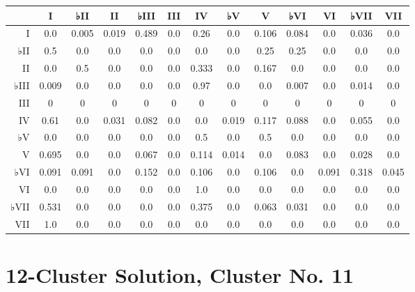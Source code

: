 \begin{table}[htbp]
\begin{minipage}{\linewidth}
\setlength{\tymax}{0.5\linewidth}
\centering
\small
\begin{tabulary}{\textwidth}{@{}RCCCCCCCCCCCC@{}} \toprule
&I&♭II&II&♭III&III&IV&♭V&V&♭VI&VI&♭VII&VII\\
\midrule
I&0.0&0.005&0.019&0.489&0.0&0.26&0.0&0.106&0.084&0.0&0.036&0.0\\
♭II&0.5&0.0&0.0&0.0&0.0&0.0&0.0&0.25&0.25&0.0&0.0&0.0\\
II&0.0&0.5&0.0&0.0&0.0&0.333&0.0&0.167&0.0&0.0&0.0&0.0\\
♭III&0.009&0.0&0.0&0.0&0.0&0.97&0.0&0.0&0.007&0.0&0.014&0.0\\
III&0&0&0&0&0&0&0&0&0&0&0&0\\
IV&0.61&0.0&0.031&0.082&0.0&0.0&0.019&0.117&0.088&0.0&0.055&0.0\\
♭V&0.0&0.0&0.0&0.0&0.0&0.5&0.0&0.5&0.0&0.0&0.0&0.0\\
V&0.695&0.0&0.0&0.067&0.0&0.114&0.014&0.0&0.083&0.0&0.028&0.0\\
♭VI&0.091&0.091&0.0&0.152&0.0&0.106&0.0&0.106&0.0&0.091&0.318&0.045\\
VI&0.0&0.0&0.0&0.0&0.0&1.0&0.0&0.0&0.0&0.0&0.0&0.0\\
♭VII&0.531&0.0&0.0&0.0&0.0&0.375&0.0&0.063&0.031&0.0&0.0&0.0\\
VII&1.0&0.0&0.0&0.0&0.0&0.0&0.0&0.0&0.0&0.0&0.0&0.0\\

\bottomrule

\end{tabulary}
\end{minipage}
\end{table}

\section{12-Cluster Solution, Cluster No. 11}
\label{12-clustersolutionclusterno.11}

